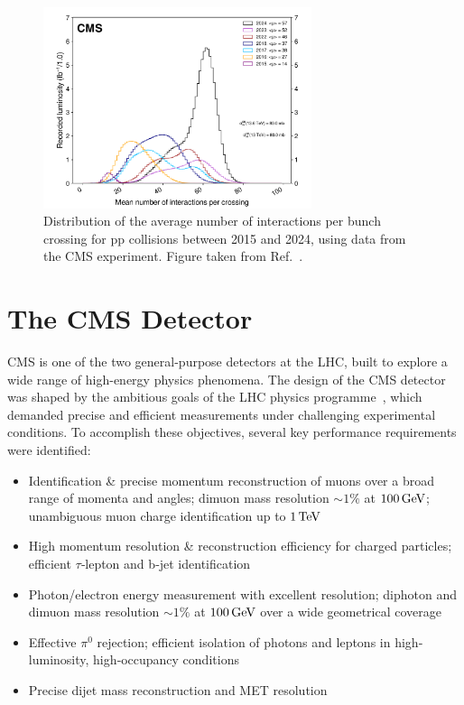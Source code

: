 \begin{figure}[h]
\centering
\includegraphics[width= 0.7\textwidth]{Figures/Chapter3/CMS_Pileup.pdf}
\caption[Distribution of the average number of interactions per bunch crossing for pp collisions at CMS between 2015 and 2024]{Distribution of the average number of interactions per bunch crossing for pp collisions between 2015 and 2024, using data from the CMS experiment. Figure taken from Ref.~\cite{CMS_IntegratedLumi}.}
\label{Figure:Chapter3_CMS_Pileup}
\end{figure}

\section{The CMS Detector}
\label{Section:Chapter3_CMS_Detector_Introduction}
CMS is one of the two general-purpose detectors at the LHC, built to explore a wide range of high-energy physics phenomena. The design of the CMS detector was shaped by the ambitious goals of the LHC physics programme~\cite{LHC_CMS}, which demanded precise and efficient measurements under challenging experimental conditions. To accomplish these objectives, several key performance requirements were identified:

\begin{itemize}
  \item Identification \& precise momentum reconstruction of muons over a broad range of momenta and angles; dimuon mass resolution $\sim1\%$ at $100\,\text{Ge\hspace{-.08em}V}$; unambiguous muon charge identification up to $1\,\text{Te\hspace{-.08em}V}$
  \item High momentum resolution \& reconstruction efficiency for charged particles; efficient $\tau$‐lepton and b‐jet identification
  \item Photon/electron energy measurement with excellent resolution; diphoton and dimuon mass resolution $\sim1\%$ at $100\,\text{Ge\hspace{-.08em}V}$ over a wide geometrical coverage
  \item Effective $\pi^0$ rejection; efficient isolation of photons and leptons in high‐luminosity, high‐occupancy conditions
  \item Precise dijet mass reconstruction and MET resolution
\end{itemize}

